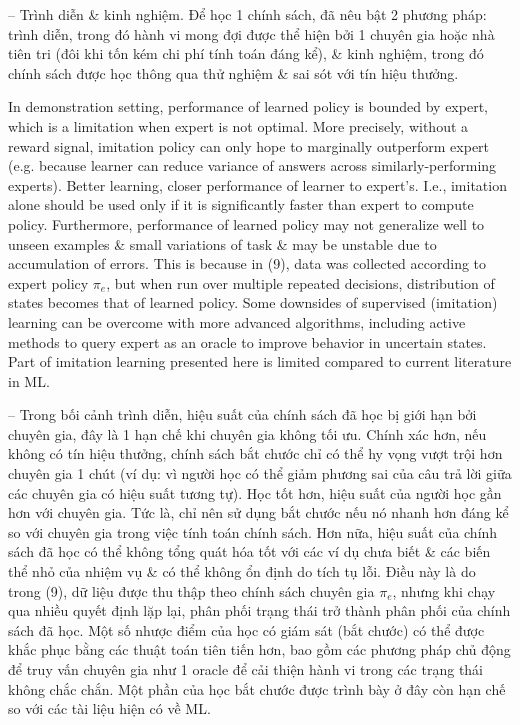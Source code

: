\documentclass{article}
\begin{document}
\begin{itemize}
\begin{itemize}
        -- {\sf Trình diễn \& kinh nghiệm.} Để học 1 chính sách, đã nêu bật 2 phương pháp: trình diễn, trong đó hành vi mong đợi được thể hiện bởi 1 chuyên gia hoặc nhà tiên tri (đôi khi tốn kém chi phí tính toán đáng kể), \& kinh nghiệm, trong đó chính sách được học thông qua thử nghiệm \& sai sót với tín hiệu thưởng.

        In demonstration setting, performance of learned policy is bounded by expert, which is a limitation when expert is not optimal. More precisely, without a reward signal, imitation policy can only hope to marginally outperform expert (e.g. because learner can reduce variance of answers across similarly-performing experts). Better learning, closer performance of learner to expert's. I.e., imitation alone should be used only if it is significantly faster than expert to compute policy. Furthermore, performance of learned policy may not generalize well to unseen examples \& small variations of task \& may be unstable due to accumulation of errors. This is because in (9), data was collected according to expert policy $\pi_e$, but when run over multiple repeated decisions, distribution of states becomes that of learned policy. Some downsides of supervised (imitation) learning can be overcome with more advanced algorithms, including active methods to query expert as an oracle to improve behavior in uncertain states. Part of imitation learning presented here is limited compared to current literature in ML.

        -- Trong bối cảnh trình diễn, hiệu suất của chính sách đã học bị giới hạn bởi chuyên gia, đây là 1 hạn chế khi chuyên gia không tối ưu. Chính xác hơn, nếu không có tín hiệu thưởng, chính sách bắt chước chỉ có thể hy vọng vượt trội hơn chuyên gia 1 chút (ví dụ: vì người học có thể giảm phương sai của câu trả lời giữa các chuyên gia có hiệu suất tương tự). Học tốt hơn, hiệu suất của người học gần hơn với chuyên gia. Tức là, chỉ nên sử dụng bắt chước nếu nó nhanh hơn đáng kể so với chuyên gia trong việc tính toán chính sách. Hơn nữa, hiệu suất của chính sách đã học có thể không tổng quát hóa tốt với các ví dụ chưa biết \& các biến thể nhỏ của nhiệm vụ \& có thể không ổn định do tích tụ lỗi. Điều này là do trong (9), dữ liệu được thu thập theo chính sách chuyên gia $\pi_e$, nhưng khi chạy qua nhiều quyết định lặp lại, phân phối trạng thái trở thành phân phối của chính sách đã học. Một số nhược điểm của học có giám sát (bắt chước) có thể được khắc phục bằng các thuật toán tiên tiến hơn, bao gồm các phương pháp chủ động để truy vấn chuyên gia như 1 oracle để cải thiện hành vi trong các trạng thái không chắc chắn. Một phần của học bắt chước được trình bày ở đây còn hạn chế so với các tài liệu hiện có về ML.


\end{itemize}
\end{itemize}
\end{document}
